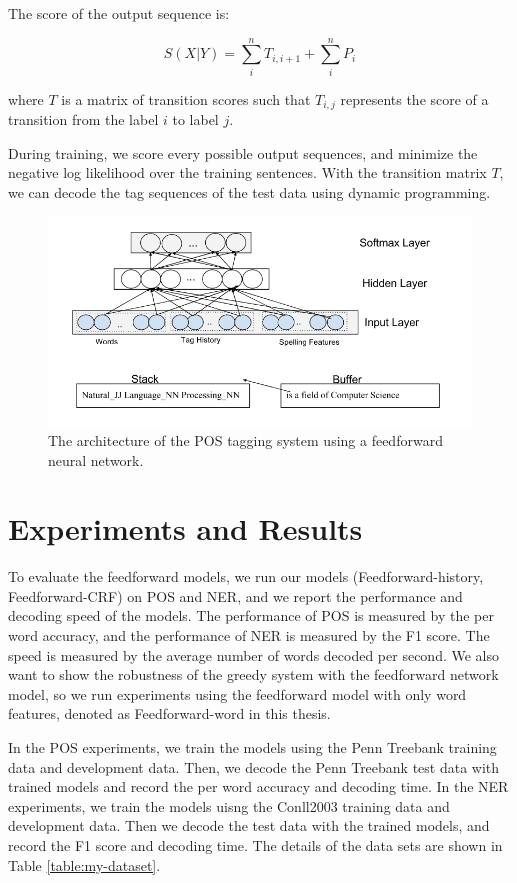 \documentclass{sfuthesis}
\begin{document}
The score of the output sequence is:

\begin{equation}
S\left( X|Y\right)=\sum _{i}^{n}T_{i,i+1}+\sum _{i}^{n}P_{i}
\end{equation}

where $T$ is a matrix of transition scores such that $T_{i,j}$ represents the score of a transition from the label $i$ to label $j$.

During training, we score every possible output sequences, and minimize the negative log likelihood over the training sentences. With the transition matrix $T$, we can decode the tag sequences of the test data using dynamic programming.



\begin{figure}
  \centering
  \includegraphics[scale=0.6]{greedypos.png}
 \caption{The architecture of the POS tagging system using a feedforward neural network.}
  \label{fig:greedypos}
\end{figure}


\section{Experiments and Results}
To evaluate the feedforward models, we run our models (Feedforward-history, Feedforward-CRF) on POS and NER, and we report the performance and decoding speed of the models. The performance of POS is measured by the per word accuracy, and the performance of NER is measured by the F1 score. The speed is measured by the average number of words decoded per second. We also want to show the robustness of the greedy system with the feedforward network model, so we run experiments using the feedforward model with only word features, denoted as Feedforward-word in this thesis. 

In the POS experiments, we train the models using the Penn Treebank training data and development data. Then, we decode the Penn Treebank test data with trained models and record the per word accuracy and decoding time. In the NER experiments, we train the models uisng the Conll2003 training data and development data. Then we decode the test data with the trained models, and record the F1 score and decoding time. The details of the data sets are shown in Table \ref{table:my-dataset}.
\end{document}
